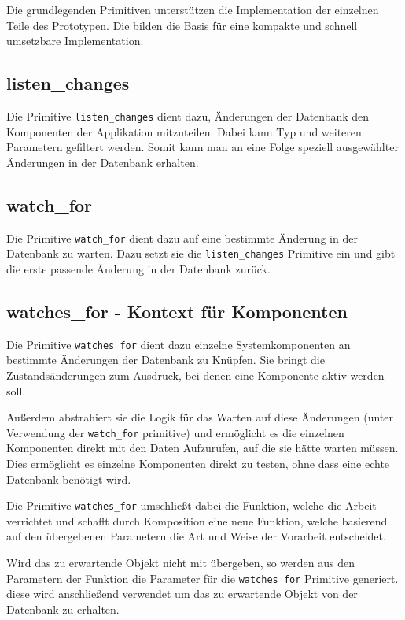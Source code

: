 Die grundlegenden Primitiven unterstützen die Implementation der einzelnen Teile des Prototypen. Die bilden die Basis für eine kompakte und schnell umsetzbare Implementation.

\subsection{listen\_changes}

Die Primitive \verb|listen_changes| dient dazu,
Änderungen der Datenbank den Komponenten der Applikation mitzuteilen.
Dabei kann Typ und weiteren Parametern gefiltert werden.
Somit kann man an eine Folge speziell ausgewählter Änderungen in der Datenbank erhalten.

\subsection{watch\_for}

Die Primitive \verb|watch_for| dient dazu auf eine bestimmte Änderung in der Datenbank zu warten. Dazu setzt sie die \verb|listen_changes| Primitive ein und gibt die erste passende Änderung in der Datenbank zurück.

\subsection{watches\_for - Kontext für Komponenten}

Die Primitive \verb|watches_for| dient dazu einzelne Systemkomponenten
an bestimmte Änderungen der Datenbank zu Knüpfen.
Sie bringt die Zustandsänderungen zum Ausdruck,
bei denen eine Komponente aktiv werden soll.

Außerdem abstrahiert sie die Logik für das Warten auf diese Änderungen
(unter Verwendung der \verb|watch_for| primitive)
und ermöglicht es die einzelnen Komponenten direkt mit den Daten Aufzurufen,
auf die sie hätte warten müssen.
Dies ermöglicht es einzelne Komponenten direkt zu testen, ohne dass eine echte Datenbank benötigt wird.

Die Primitive \verb|watches_for| umschließt dabei die Funktion, welche die Arbeit verrichtet und schafft durch Komposition eine neue Funktion,
welche basierend auf den übergebenen Parametern die Art und Weise der Vorarbeit entscheidet.

Wird das zu erwartende Objekt nicht mit übergeben, so werden aus den Parametern der Funktion die Parameter für die \verb|watches_for| Primitive generiert.
diese wird anschließend verwendet um das zu erwartende Objekt von der Datenbank zu erhalten.



